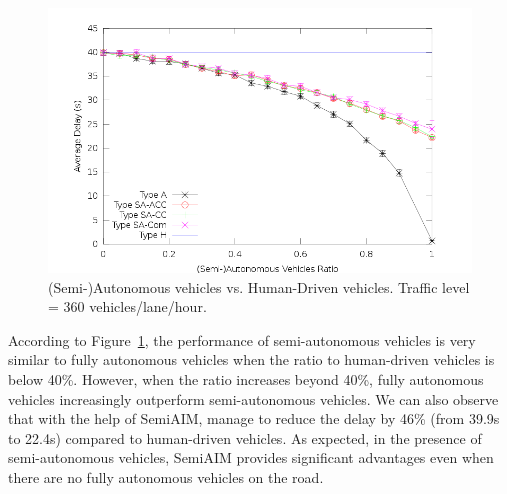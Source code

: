 


\begin{figure}
\centering
\includegraphics[width=0.9\columnwidth]{figures/figure_1.png}
\caption{(Semi-)Autonomous vehicles vs. Human-Driven vehicles. Traffic
level = 360 vehicles/lane/hour.}
\label{fig:two360}
\vspace{-.2in}
\end{figure}

According to Figure~\ref{fig:two360}, the performance of
semi-autonomous vehicles is very similar to fully autonomous vehicles
when the ratio to human-driven vehicles is below 40\%.  However, when
the ratio increases beyond 40\%, fully autonomous vehicles
increasingly outperform semi-autonomous vehicles.
We can also observe that 
with the help of SemiAIM, manage to reduce the delay by 46\% (from
39.9s to 22.4s) compared to human-driven vehicles.  As expected, in
the presence of semi-autonomous vehicles, SemiAIM provides significant
advantages even when there are no fully autonomous vehicles on the
road.

